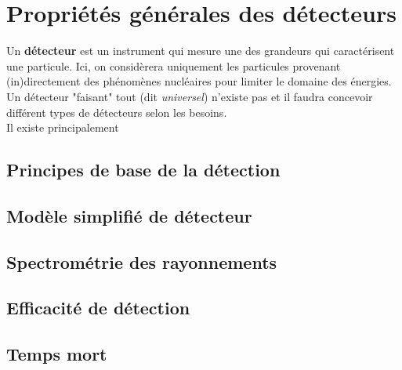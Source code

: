 \chapter{Propriétés générales des détecteurs}
Un \textbf{détecteur} est un instrument qui mesure une des grandeurs qui caractérisent une particule.
Ici, on considèrera uniquement les particules provenant (in)directement des phénomènes nucléaires 
pour limiter le domaine des énergies. Un détecteur "faisant" tout (dit \textit{universel}) n'existe 
pas et il faudra concevoir différent types de détecteurs selon les besoins.\\

Il existe principalement


\section{Principes de base de la détection}%
\section{Modèle simplifié de détecteur}%
\section{Spectrométrie des rayonnements}
\section{Efficacité de détection}
\section{Temps mort}